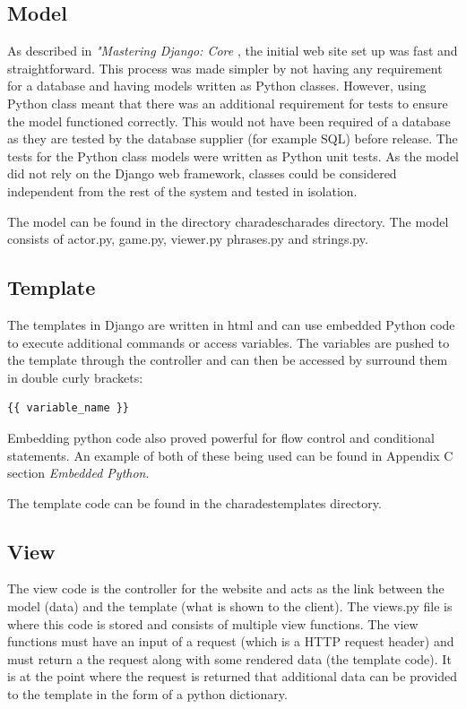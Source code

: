 \subsection{Model}
As described in \textit{"Mastering Django: Core} \cite{django_book}, the initial web site set up was fast and straightforward. This process was made simpler by not having any requirement for a database and having models written as Python classes. However, using Python class meant that there was an additional requirement for tests to ensure the model functioned correctly. This would not have been required of a database as they are tested by the database supplier (for example SQL) before release. The tests for the Python class models were written as Python unit tests. As the model did not rely on the Django web framework, classes could be considered independent from the rest of the system and tested in isolation.

The model can be found in the directory \/charades\/charades\/ directory. The model consists of actor.py, game.py, viewer.py phrases.py and strings.py.

\subsection{Template}
The templates in Django are written in html and can use embedded Python code to execute additional commands or access variables. The variables are pushed to the template through the controller and can then be accessed by surround them in double curly brackets:
\begin{verbatim}
{{ variable_name }}
\end{verbatim}

Embedding python code also proved powerful for flow control and conditional statements. An example of both of these being used can be found in Appendix C section \textit{Embedded Python}.

The template code can be found in the \/charades\/templates directory.

\subsection{View}
The view code is the controller for the website and acts as the link between the model (data) and the template (what is shown to the client). The views.py file is where this code is stored and consists of multiple view functions. The view functions must have an input of a request (which is a HTTP request header) and must return a the request along with some rendered data (the template code). It is at the point where the request is returned that additional data can be provided to the template in the form of a python dictionary.


